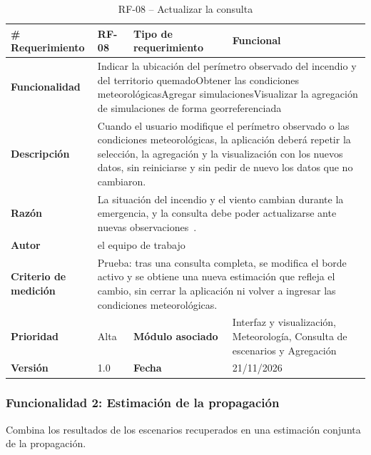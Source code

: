 \begin{longtable}{|p{\rqA}|p{\rqB}|p{\rqC}|p{\rqD}|}
  \caption{RF-08 -- Actualizar la consulta}\label{tab:rf-08}\tabularnewline
  \hline
  \textbf{\# Requerimiento} & RF-08 & \raggedright\textbf{Tipo de requerimiento} & Funcional\tabularnewline\hline
  \raggedright\textbf{Funcionalidad} & \multicolumn{3}{p{\rqBCD}|}{Indicar la ubicación del perímetro observado del incendio y del territorio quemado\newline Obtener las condiciones meteorológicas\newline Agregar simulaciones\newline Visualizar la agregación de simulaciones de forma georreferenciada}\tabularnewline\hline
  \endfirsthead
  \textbf{Descripción} & \multicolumn{3}{p{\rqBCD}|}{Cuando el usuario modifique el perímetro observado o las condiciones meteorológicas, la aplicación deberá repetir la selección, la agregación y la visualización con los nuevos datos, sin reiniciarse y sin pedir de nuevo los datos que no cambiaron.}\tabularnewline\hline
  \textbf{Razón} & \multicolumn{3}{p{\rqBCD}|}{La situación del incendio y el viento cambian durante la emergencia, y la consulta debe poder actualizarse ante nuevas observaciones~\cite{vfp2026}.}\tabularnewline\hline
  \textbf{Autor} & \multicolumn{3}{p{\rqBCD}|}{el equipo de trabajo}\tabularnewline\hline
  \raggedright\textbf{Criterio de medición} & \multicolumn{3}{p{\rqBCD}|}{Prueba: tras una consulta completa, se modifica el borde activo y se obtiene una nueva estimación que refleja el cambio, sin cerrar la aplicación ni volver a ingresar las condiciones meteorológicas.}\tabularnewline\hline
  \textbf{Prioridad} & Alta & \raggedright\textbf{Módulo asociado} & Interfaz y visualización, Meteorología, Consulta de escenarios y Agregación\tabularnewline\hline
  \textbf{Versión} & 1.0 & \textbf{Fecha} & 21/11/2026\tabularnewline\hline
\end{longtable}

\subsubsection{Funcionalidad 2: Estimación de la propagación}

Combina los resultados de los escenarios recuperados en una estimación conjunta de la propagación.

